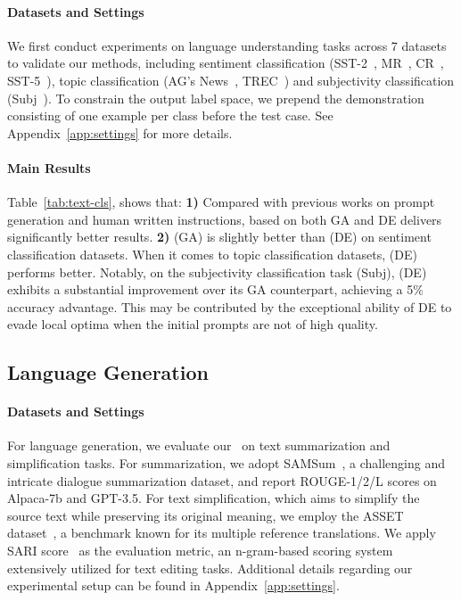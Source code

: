 \paragraph{Datasets and Settings}
We first conduct experiments on language understanding tasks across 7 datasets to validate our methods, including sentiment classification (SST-2~\citep{socher2013recursive}, MR~\citep{pang2005MR}, CR~\citep{hu2004CR}, SST-5~\citep{socher2013recursive}), topic classification (AG's News~\citep{zhang2015character}, TREC~\citep{voorhees2000building}) and subjectivity classification (Subj~\citep{pang2004sentimental}).
To constrain the output label space, we prepend the demonstration consisting of one example per class before the test case. See Appendix~\ref{app:settings} for more details.




\paragraph{Main Results} Table~\ref{tab:text-cls}, shows that: \textbf{1)} Compared with previous works on prompt generation and human written instructions, \modelname based on both GA and DE delivers significantly better results.
\textbf{2)} \modelname (GA) is slightly better than \modelname (DE) on sentiment classification datasets. When it comes to topic classification datasets, \modelname (DE) performs better. Notably, on the subjectivity classification task (Subj), \modelname (DE) exhibits a substantial improvement over its GA counterpart, achieving a 5\% accuracy advantage. This may be contributed by the exceptional ability of DE to evade local optima when the initial prompts are not of high quality.







\subsection{Language Generation}

\paragraph{Datasets and Settings}

For language generation, we evaluate our \modelname~on text summarization and simplification tasks. For summarization, we adopt SAMSum~\citep{gliwa2019samsum}, a challenging and intricate dialogue summarization dataset, and report ROUGE-1/2/L scores on Alpaca-7b and GPT-3.5.
For text simplification, which aims to simplify the source text while preserving its original meaning, we employ the ASSET dataset~\citep{alva2020asset}, a benchmark known for its multiple reference translations. We apply SARI score~\citep{xu2016optimizing} as the evaluation metric, an n-gram-based scoring system extensively utilized for text editing tasks. Additional details regarding our experimental setup can be found in Appendix~\ref{app:settings}.

